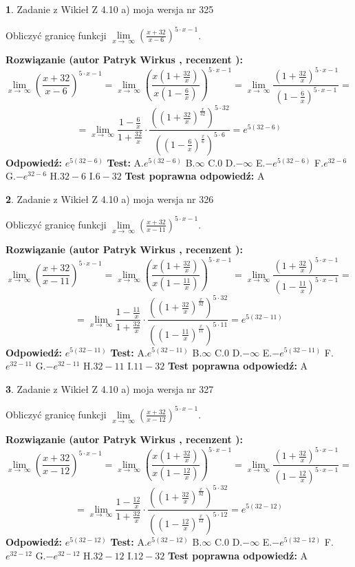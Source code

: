 \documentclass[12pt, a4paper]{article}
\theoremstyle{definition} %
\newtheorem{zad}{}
\newcommand{\zadStart}[1]{\begin{zad}#1\newline}
\newcommand{\zadStop}{\end{zad}}
\newcommand{\rozwStart}[2]{\noindent \textbf{Rozwiązanie (autor #1 , recenzent #2): }\newline}
\newcommand{\rozwStop}{\newline}
\newcommand{\odpStart}{\noindent \textbf{Odpowiedź:}\newline}
\newcommand{\odpStop}{\newline}
\newcommand{\testStart}{\noindent \textbf{Test:}\newline}
\newcommand{\testStop}{\newline}
\newcommand{\kluczStart}{\noindent \textbf{Test poprawna odpowiedź:}\newline}
\newcommand{\kluczStop}{\newline}
\begin{document}
\zadStart{Zadanie z Wikieł Z 4.10 a) moja wersja nr 325}


Obliczyć granicę funkcji  $\lim\limits_{x\to\ \infty}(\frac{x+32}{x-6})^{5\cdot x-1}$.
\zadStop
\rozwStart{Patryk Wirkus}{}
$$\lim\limits_{x\to\ \infty}(\frac{x+32}{x-6})^{5\cdot x-1} = \lim\limits_{x\to\ \infty}(\frac{x(1+\frac{32}{x})}{x(1-\frac{6}{x})})^{5\cdot x-1}=\lim\limits_{x\to\ \infty}\frac{(1+\frac{32}{x})^{5\cdot x-1}}{(1-\frac{6}{x})^{5\cdot x-1}}=$$
$$=\lim\limits_{x\to\ \infty}\frac{1-\frac{6}{x}}{1+\frac{32}{x}}\cdot\frac{((1+\frac{32}{x})^{\frac{x}{32}})^{5\cdot32}}{((1-\frac{6}{x})^{\frac{x}{6}})^{5\cdot6}}=e^{5(32-6)}$$
\rozwStop
\odpStart
$e^{5(32-6)}$
\odpStop
\testStart
A.$e^{5(32-6)}$ B.$\infty$ C.$0$ D.$-\infty$ E.$-e^{5(32-6)}$
F.$e^{32-6}$ G.$-e^{32-6}$
H.$32-6$
I.$6-32$
\testStop
\kluczStart
A
\kluczStop



\zadStart{Zadanie z Wikieł Z 4.10 a) moja wersja nr 326}


Obliczyć granicę funkcji  $\lim\limits_{x\to\ \infty}(\frac{x+32}{x-11})^{5\cdot x-1}$.
\zadStop
\rozwStart{Patryk Wirkus}{}
$$\lim\limits_{x\to\ \infty}(\frac{x+32}{x-11})^{5\cdot x-1} = \lim\limits_{x\to\ \infty}(\frac{x(1+\frac{32}{x})}{x(1-\frac{11}{x})})^{5\cdot x-1}=\lim\limits_{x\to\ \infty}\frac{(1+\frac{32}{x})^{5\cdot x-1}}{(1-\frac{11}{x})^{5\cdot x-1}}=$$
$$=\lim\limits_{x\to\ \infty}\frac{1-\frac{11}{x}}{1+\frac{32}{x}}\cdot\frac{((1+\frac{32}{x})^{\frac{x}{32}})^{5\cdot32}}{((1-\frac{11}{x})^{\frac{x}{11}})^{5\cdot11}}=e^{5(32-11)}$$
\rozwStop
\odpStart
$e^{5(32-11)}$
\odpStop
\testStart
A.$e^{5(32-11)}$ B.$\infty$ C.$0$ D.$-\infty$ E.$-e^{5(32-11)}$
F.$e^{32-11}$ G.$-e^{32-11}$
H.$32-11$
I.$11-32$
\testStop
\kluczStart
A
\kluczStop



\zadStart{Zadanie z Wikieł Z 4.10 a) moja wersja nr 327}


Obliczyć granicę funkcji  $\lim\limits_{x\to\ \infty}(\frac{x+32}{x-12})^{5\cdot x-1}$.
\zadStop
\rozwStart{Patryk Wirkus}{}
$$\lim\limits_{x\to\ \infty}(\frac{x+32}{x-12})^{5\cdot x-1} = \lim\limits_{x\to\ \infty}(\frac{x(1+\frac{32}{x})}{x(1-\frac{12}{x})})^{5\cdot x-1}=\lim\limits_{x\to\ \infty}\frac{(1+\frac{32}{x})^{5\cdot x-1}}{(1-\frac{12}{x})^{5\cdot x-1}}=$$
$$=\lim\limits_{x\to\ \infty}\frac{1-\frac{12}{x}}{1+\frac{32}{x}}\cdot\frac{((1+\frac{32}{x})^{\frac{x}{32}})^{5\cdot32}}{((1-\frac{12}{x})^{\frac{x}{12}})^{5\cdot12}}=e^{5(32-12)}$$
\rozwStop
\odpStart
$e^{5(32-12)}$
\odpStop
\testStart
A.$e^{5(32-12)}$ B.$\infty$ C.$0$ D.$-\infty$ E.$-e^{5(32-12)}$
F.$e^{32-12}$ G.$-e^{32-12}$
H.$32-12$
I.$12-32$
\testStop
\kluczStart
A
\kluczStop
\end{document}

